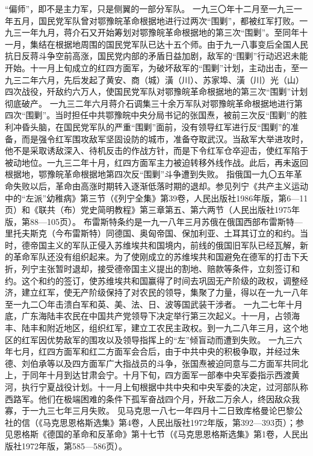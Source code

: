 \begin{maonote}
“偏师”，即不是主力军，只是侧翼的一部分军队。
一九三〇年十二月至一九三一年五月，国民党军队曾对鄂豫皖革命根据地进行过两次“围剿”，都被红军打败。一九三一年九月，蒋介石又开始筹划对鄂豫皖革命根据地的第三次“围剿”。至同年十一月，集结在根据地周围的国民党军队已达十五个师。由于九一八事变后全国人民抗日反蒋斗争空前高涨，国民党内部的矛盾日益加剧，敌军的“围剿”行动迟迟未能开始。十一月上旬成立的红四方面军，为破坏敌军的“围剿”计划，主动出击，至一九三二年六月，先后发起了黄安、商（城）潢（川）、苏家埠、潢（川）光（山）四次战役，歼敌约六万人，使国民党军队对鄂豫皖革命根据地的第三次“围剿”计划彻底破产。
一九三二年六月蒋介石调集三十余万军队对鄂豫皖革命根据地进行第四次“围剿”。当时担任中共鄂豫皖中央分局书记的张国焘，被前三次反“围剿”的胜利冲昏头脑，在国民党军队的严重“围剿”面前，没有领导红军进行反“围剿”的准备，而是强令红军围攻敌军坚固设防的城市，准备夺取武汉。当敌军大举进攻时，他不是采取诱敌深入、待机反击的作战方针，而是下令红军仓卒迎击，使红军陷于被动地位。一九三二年十月，红四方面军主力被迫转移外线作战。此后，再未返回根据地，鄂豫皖革命根据地第四次反“围剿”斗争遭到失败。
指俄国一九〇五年革命失败以后，革命由高涨时期转入逐渐低落时期的退却。参见列宁《共产主义运动中的“左派”幼稚病》第三节（《列宁全集》第39卷，人民出版社1986年版，第6—11页）和《联共（布）党史简明教程》第三章第五、第六两节（人民出版社1975年版，第88—105页）。
布雷斯特条约是一九一八年三月苏俄在俄国西部布雷斯特—里托夫斯克（今布雷斯特）同德国、奥匈帝国、保加利亚、土耳其订立的和约。当时，德帝国主义的军队正侵入苏维埃共和国境内，前线的俄国旧军队已经瓦解，新的革命军队还没有组织起来。为了使刚成立的苏维埃共和国避免在德军的打击下夭折，列宁主张暂时退却，接受德帝国主义提出的割地、赔款等条件，立刻签订和约。这个和约的签订，使苏维埃共和国赢得了时间去巩固无产阶级的政权，调整经济，建立红军，使无产阶级保持了对农民的领导，集聚了力量，得以在一九一八年至一九二〇年击溃白军和英、美、法、日、波等国武装干涉者。
一九二七年十月底，广东海陆丰农民在中国共产党领导下决定举行第三次起义。十一月，占领海丰、陆丰和附近地区，组织红军，建立工农民主政权。到一九二八年三月，这个地区的红军因优势敌军的围攻以及领导指挥上的“左”倾盲动而遭到失败。
一九三六年七月，红四方面军和红二方面军会合后，由于中共中央的积极争取，并经过朱德、刘伯承等以及四方面军广大指战员的斗争，张国焘被迫同意与二方面军共同北上，于同年十月到达甘肃会宁。十月下旬，四方面军一部奉中央军委指示西渡黄河，执行宁夏战役计划。十一月上旬根据中共中央和中央军委的决定，过河部队称西路军。他们在极端困难的条件下孤军奋战四个月，歼敌二万余人，终因敌众我寡，于一九三七年三月失败。
见马克思一八七一年四月十二日致库格曼论巴黎公社的信（《马克思恩格斯选集》第4卷，人民出版社1972年版，第392—393页）；参见恩格斯《德国的革命和反革命》第十七节（《马克思恩格斯选集》第1卷，人民出版社1972年版，第585—586页）。

\end{maonote}
